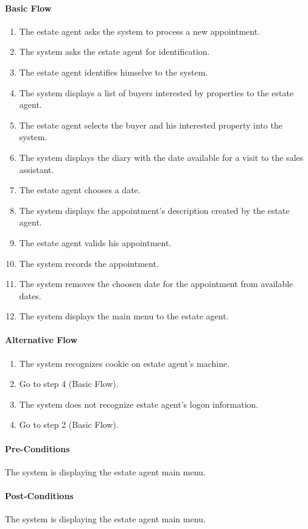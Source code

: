 \documentclass[a4paper,12pt]{article}
\begin{document}
\paragraph{Basic Flow}
\begin{enumerate}
\item The estate agent asks the system to process a new appointment.
\item The system asks the estate agent for identification.
\item The estate agent identifies himselve to the system.
\item The system displays a list of buyers interested by properties to the estate agent.
\item The estate agent selects the buyer and his interested property into the system.
\item The system displays the diary with the date available for a visit to the sales assistant.
\item The estate agent chooses a date.
\item The system displays the appointment's description created by the estate agent.
\item The estate agent valids his appointment.
\item The system records the appointment.
\item The system removes the choosen date for the appointment from available dates.
\item The system displays the main menu to the estate agent.
\end{enumerate}
\paragraph{Alternative Flow}
\begin{enumerate}
\item The system recognizes cookie on estate agent's machine. 
\item Go to step 4 (Basic Flow).
\item The system does not recognize estate agent's logon information.
\item Go to step 2 (Basic Flow).
\end{enumerate}
\paragraph{Pre-Conditions}
The system is displaying the estate agent main menu.
\paragraph{Post-Conditions}
The system is displaying the estate agent main menu.
\end{document}
